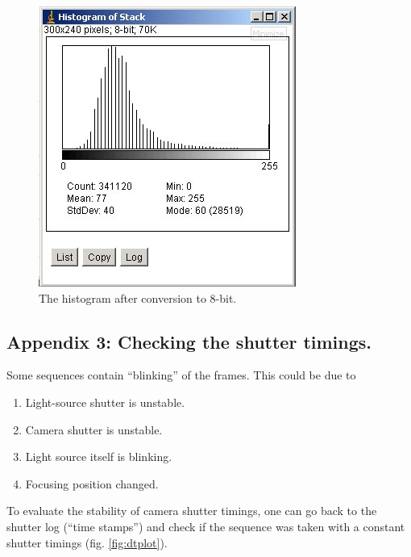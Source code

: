 \documentclass{article}
\begin{document}
\begin{figure}[!ht]
\centering
\includegraphics[scale=0.4]{img/image052.jpg}
\caption{The histogram after conversion to 8-bit.}
\label{fig:postconversion}
\end{figure}


\subsection{Appendix 3: Checking the shutter timings.}

Some sequences contain ``blinking'' of the frames. This could be due to

\begin{enumerate}
\def\labelenumi{\arabic{enumi}.}
\itemsep1pt\parskip0pt
\item
  Light-source shutter is unstable.
\item
  Camera shutter is unstable.
\item
  Light source itself is blinking.
\item
  Focusing position changed.
\end{enumerate}

To evaluate the stability of camera shutter timings, one can go back to the shutter log (``time stamps'') and check if the sequence was taken with a constant shutter timings (fig. \ref{fig:dtplot}).

\end{document}
